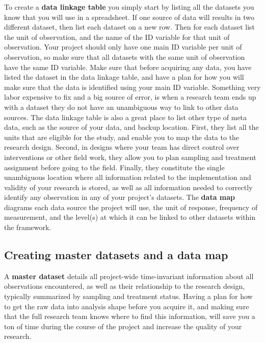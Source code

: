 To create a \textbf{data linkage table} you simply start by listing 
all the datasets you know that you will use in a spreadsheet.
If one source of data will results in two different dataset, 
then list each dataset on a new row.
Then for each dataset list the unit of observation,
and the name of the ID variable for that unit of observation.
Your project should only have one main ID variable per unit of observation, 
so make sure that all datasets with the same unit of observation
have the same ID variable.
Make sure that before acquiring any data,
you have listed the dataset in the data linkage table, 
and have a plan for how you will make sure that the data
is identified using your main ID variable.
Something very labor expensive to fix and a big source of error, 
is when a research team ends up with a dataset they do not have an 
unambiguous way to link to other data sources.
The data linkage table is also a great place to list other type of meta data,
such as the source of your data, and backup location.
First, they list all the units that are eligible for the study,
and enable you to map the data to the research design.
Second, in designs where your team has direct control over interventions or other field work,
they allow you to plan sampling and treatment assignment before going to the field.
Finally, they constitute the single unambiguous location where all information 
related to the implementation and validity of your research is stored,
as well as all information needed to correctly identify any observation in any of your project's datasets.
The \textbf{data map} diagrams each data source the project will use, 
the unit of response, frequency of measurement, 
and the level(s) at which it can be linked to other datasets within the framework. 


\subsection{Creating master datasets and a data map}

A \textbf{master dataset}
details all project-wide time-invariant information
about all observations encountered,
as well as their relationship to the research design,
typically summarized by sampling and treatment status.
Having a plan for how to get the raw data into analysis shape 
before you acquire it,
and making sure that the full research team knows where to find this information,
will save you a ton of time during the course of the project
and increase the quality of your research.

